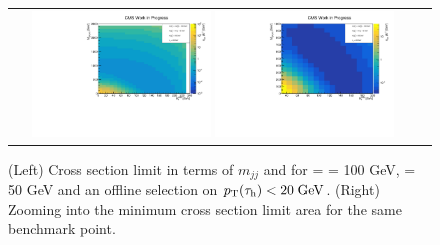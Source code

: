 \begin{figure}[tbh!]
	\centering
	\begin{tabular}{cc}
		\includegraphics[width=0.45\textwidth]{analysis/pics/JetInvMass_vs_MET_xsec_chi100_lsp050_taupt20.pdf}
		\includegraphics[width=0.45\textwidth]{analysis/pics/JetInvMass_vs_MET_xsec_chi100_lsp050_taupt20_zoom.pdf} 		
	\end{tabular}
	\caption{(Left) Cross section limit in terms of $m_{jj}$ and \met for \charginopm = \neutralinotwo = 100 GeV, \neutralinoone = 50 GeV and an offline selection on $p_{\text{T}}(\tau_{\text{h}}) <  20\;\text{Ge}\kern-0.06667em\text{V}$. (Right) Zooming into the minimum cross section limit area for the same benchmark point.}
	\label{fig::JetInvMass_vs_MET_xsec_chi100_lsp050_taupt20}
\end{figure}

